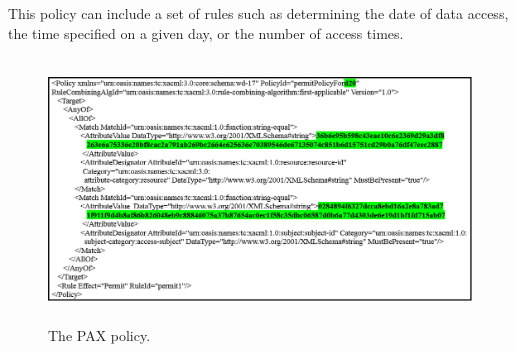 \documentclass[journal,article,submit,moreauthors,pdftex]{Definitions/mdpi}
\begin{document}
\begin{itemize}
This policy can include a set of rules such as determining the date of data access,
the time specified on a given day, or the number of access times.

\begin{figure}[ht!]
\centering
  \includegraphics[scale=0.39,width=14cm,height=7cm]{policy.png}
	\caption{The PAX policy.}
	\label{fig:policy}
\end{figure}


\end{itemize}
\end{document}
